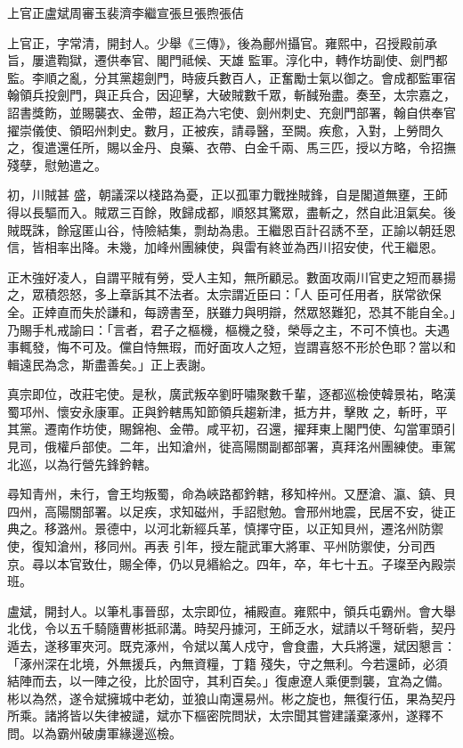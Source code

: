
\begin{pinyinscope}

 上官正盧斌周審玉裴濟李繼宣張旦張煦張佶



 上官正，字常清，開封人。少舉《三傳》，後為鄜州攝官。雍熙中，召授殿前承旨，屢遣鞫獄，遷供奉官、閣門祗候、天雄
 監軍。淳化中，轉作坊副使、劍門都監。李順之亂，分其黨趨劍門，時疲兵數百人，正奮勵士氣以御之。會成都監軍宿翰領兵投劍門，與正兵合，因迎擊，大破賊數千眾，斬馘殆盡。奏至，太宗嘉之，詔書獎飭，並賜襲衣、金帶，超正為六宅使、劍州刺史、充劍門部署，翰自供奉官擢崇儀使、領昭州刺史。數月，正被疾，請尋醫，至闕。疾愈，入對，上勞問久之，復遣還任所，賜以金丹、良藥、衣帶、白金千兩、馬三匹，授以方略，令招撫殘孽，慰勉遣之。



 初，川賊甚
 盛，朝議深以棧路為憂，正以孤軍力戰挫賊鋒，自是閣道無壅，王師得以長驅而入。賊眾三百餘，敗歸成都，順怒其驚眾，盡斬之，然自此沮氣矣。後賊既誅，餘寇匿山谷，恃險結集，剽劫為患。王繼恩百計召誘不至，正諭以朝廷恩信，皆相率出降。未幾，加峰州團練使，與雷有終並為西川招安使，代王繼恩。



 正木強好凌人，自謂平賊有勞，受人主知，無所顧忌。數面攻兩川官吏之短而暴揚之，眾積怨怒，多上章訴其不法者。太宗謂近臣曰：「人
 臣可任用者，朕常欲保全。正婞直而失於謙和，每謗書至，朕雖力與明辯，然眾怒難犯，恐其不能自全。」乃賜手札戒諭曰：「言者，君子之樞機，樞機之發，榮辱之主，不可不慎也。夫遇事輒發，悔不可及。儻自恃無瑕，而好面攻人之短，豈謂喜怒不形於色耶？當以和輯遠民為念，斯盡善矣。」正上表謝。



 真宗即位，改莊宅使。是秋，廣武叛卒劉旴嘯聚數千輩，逐都巡檢使韓景祐，略漢蜀邛州、懷安永康軍。正與鈐轄馬知節領兵趨新津，抵方井，擊敗
 之，斬旴，平其黨。遷南作坊使，賜錦袍、金帶。咸平初，召還，擢拜東上閣門使、勾當軍頭引見司，俄權戶部使。二年，出知滄州，徙高陽關副都部署，真拜洺州團練使。車駕北巡，以為行營先鋒鈐轄。



 尋知青州，未行，會王均叛蜀，命為峽路都鈐轄，移知梓州。又歷滄、瀛、鎮、貝四州，高陽關部署。以足疾，求知磁州，手詔慰勉。會邢州地震，民居不安，徙正典之。移潞州。景德中，以河北新經兵革，慎擇守臣，以正知貝州，遷洺州防禦使，復知滄州，移同州。再表
 引年，授左龍武軍大將軍、平州防禦使，分司西京。尋以本官致仕，賜全俸，仍以見緡給之。四年，卒，年七十五。子璨至內殿崇班。



 盧斌，開封人。以筆札事晉邸，太宗即位，補殿直。雍熙中，領兵屯霸州。會大舉北伐，令以五千騎隨曹彬抵祁溝。時契丹據河，王師乏水，斌請以千弩斫砦，契丹遁去，遂移軍夾河。既克涿州，令斌以萬人戍守，會食盡，大兵將還，斌因懇言：「涿州深在北境，外無援兵，內無資糧，丁籍
 殘失，守之無利。今若還師，必須結陣而去，以一陣之役，比於固守，其利百矣。」復慮遼人乘便剽襲，宜為之備。彬以為然，遂令斌擁城中老幼，並狼山南還易州。彬之旋也，無復行伍，果為契丹所乘。諸將皆以失律被譴，斌亦下樞密院問狀，太宗聞其嘗建議棄涿州，遂釋不問。以為霸州破虜軍緣邊巡檢。




\end{pinyinscope}
